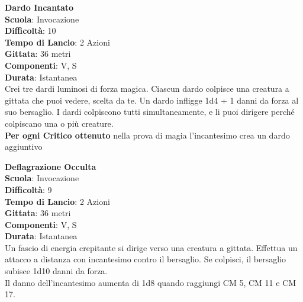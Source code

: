 \begin{multicols}{2}
\medskip\textbf{Dardo Incantato}\\
\textbf{Scuola}: Invocazione\\
\textbf{Difficoltà}:  10\\
\textbf{Tempo di Lancio}: 2 Azioni\\
\textbf{Gittata}: 36 metri\\
\textbf{Componenti}: V, S\\
\textbf{Durata}: Istantanea\\
Crei tre dardi luminosi di forza magica. Ciascun dardo colpisce una creatura a gittata che puoi vedere, scelta da te. Un dardo infligge 1d4 + 1 danni da forza al suo bersaglio. I dardi colpiscono tutti simultaneamente, e li puoi dirigere perché colpiscano una o più creature.\\
\textbf{Per ogni Critico ottenuto} nella prova di magia l'incantesimo crea un dardo aggiuntivo

\medskip\textbf{Deflagrazione Occulta}\\
\textbf{Scuola}: Invocazione\\
\textbf{Difficoltà}:  9\\
\textbf{Tempo di Lancio}: 2 Azioni\\
\textbf{Gittata}: 36 metri\\
\textbf{Componenti}: V, S\\
\textbf{Durata}: Istantanea\\
Un fascio di energia crepitante si dirige verso una creatura a gittata. Effettua un attacco a distanza con  incantesimo contro il bersaglio. Se colpisci, il bersaglio subisce 1d10 danni da forza.\\
Il danno dell'incantesimo aumenta di 1d8 quando raggiungi CM 5, CM 11 e CM 17.


\end{multicols}
